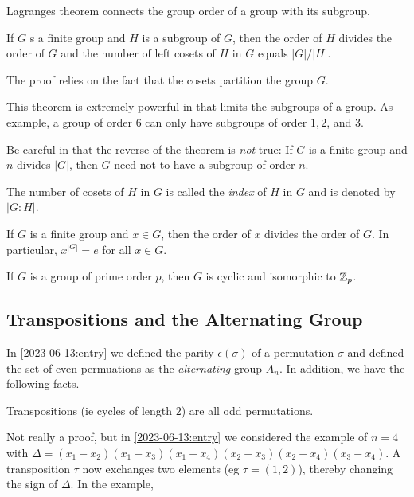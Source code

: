 Lagranges theorem connects the group order of a group with its subgroup.

\begin{theorem}
If $G$ s a finite group and $H$ is a subgroup of $G$, then the order of $H$ divides the order of $G$ and the number of left cosets of $H$ in $G$ equals $|G| / |H|$.	
\end{theorem}

The proof relies on the fact that the cosets partition the group $G$.

This theorem is extremely powerful in that limits the subgroups of a group. As example, a group of order $6$ can only have subgroups of order $1, 2$, and $3$.

Be careful in that the reverse of the theorem  is \emph{not} true: If $G$ is a finite group and $n$ divides $|G|$, then $G$ need not to have a subgroup of order $n$. 

The number of cosets of $H$ in $G$ is called the \emph{index} of $H$ in $G$ and is denoted by $|G:H|$.

\begin{theorem}
If $G$ is a finite group and $x \in G$, then the order of $x$ divides the order of $G$. In particular, $x^{|G|} = e$ for all $x \in G$.	
\end{theorem}

\begin{theorem}
If $G$ is a group of prime order $p$, then $G$ is cyclic and isomorphic to $\mathbb{Z}_p$.
\end{theorem}


\subsection{Transpositions and the Alternating Group}

In \ref{2023-06-13:entry} we defined the parity $\epsilon(\sigma)$ of a permutation $\sigma$ and defined the set of even permuations as the \emph{alternating} group $A_n$. In addition, we have the following facts.

\begin{theorem}
Transpositions (ie cycles of length $2$) are all odd permutations.
\end{theorem}

Not really a proof, but in \ref{2023-06-13:entry} we considered the example of $n=4$ with $\Delta = (x_1 - x_2)(x_1 - x_3)(x_1 - x_4)(x_2 - x_3)(x_2 - x_4)(x_3 - x_4)$. A transposition $\tau$ now exchanges two elements (eg $\tau = (1,2)$), thereby changing the sign of $\Delta$. In the example, 

